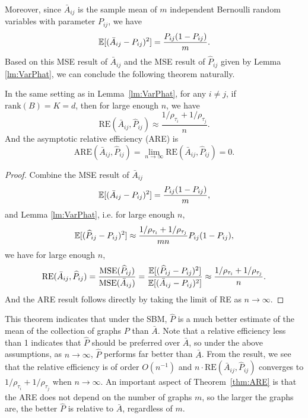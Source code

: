 Moreover, since $\bar{A}_{ij}$ is the sample mean of $m$ independent Bernoulli random variables with parameter $P_{ij}$, we have
\[
    \mathbb{E}[(\bar{A}_{ij} - P_{ij})^2] = \frac{P_{ij}(1-P_{ij})}{m}.
\]
Based on this MSE result of $\bar{A}_{ij}$ and the MSE result of $\hat{P}_{ij}$ given by Lemma \ref{lm:VarPhat}, we can conclude the following theorem naturally.
\begin{theorem}
\label{thm:ARE}
In the same setting as in Lemma~\ref{lm:VarPhat}, for any $i \ne j$, if $\mathrm{rank}(B)=K=d$, then for large enough $n$, we have
\begin{equation}
	    \mathrm{RE}(\bar{A}_{ij}, \hat{P}_{ij}) \approx
    \frac{1/\rho_{\tau_i} + 1/\rho_{\tau_j}}{n}.
\label{eq:approx_re}
\end{equation}
And the asymptotic relative efficiency (ARE) is 
\[
    \mathrm{ARE}(\bar{A}_{ij}, \hat{P}_{ij}) = \lim_{n \to \infty} \mathrm{RE}(\bar{A}_{ij}, \hat{P}_{ij}) = 0.
    \label{eq:sbm_are}
\]
\end{theorem}
\begin{proof}
Combine the MSE result of $\bar{A}_{ij}$
\[
    \mathbb{E}[(\bar{A}_{ij} - P_{ij})^2] = \frac{P_{ij}(1-P_{ij})}{m},
\]
and Lemma \ref{lm:VarPhat}, i.e. for large enough $n$,
\[
    \mathbb{E}[(\widehat{P}_{ij} - P_{ij})^2] \approx
    \frac{1/\rho_{\tau_i} + 1/\rho_{\tau_j}}{m n} P_{ij}(1-P_{ij}),
\]
we have for large enough $n$,
\[
	    \mathrm{RE}(\bar{A}_{ij}, \widehat{P}_{ij}) = \frac{\mathrm{MSE}(\widehat{P}_{ij})}{\mathrm{MSE}(\bar{A}_{ij})}
	    = \frac{\mathbb{E}[(\widehat{P}_{ij} - P_{ij})^2]}{\mathbb{E}[(\bar{A}_{ij} - P_{ij})^2]}
	    \approx \frac{1/\rho_{\tau_i} + 1/\rho_{\tau_j}}{n}.
\]
And the ARE result follows directly by taking the limit of RE as $n \to \infty$.
\end{proof}

This theorem indicates that under the SBM, $\hat{P}$ is a much better estimate of the mean of the collection of graphs $P$ than $\bar{A}$.
Note that a relative efficiency less than 1 indicates that $\hat{P}$ should be preferred over $\bar{A}$, so under the above assumptions, as $n \to \infty$, $\hat{P}$ performs far better than $\bar{A}$.
From the result, we see that the relative efficiency is of order $O(n^{-1})$ and $n \cdot \mathrm{RE}(\bar{A}_{ij}, \hat{P}_{ij})$ converges to $1/\rho_{\tau_i}+1/\rho_{\tau_j}$ when $n \to \infty$.
An important aspect of Theorem~\ref{thm:ARE} is that the ARE does not depend on the number of graphs $m$, so the larger the graphs are, the better $\hat{P}$ is relative to $\bar{A}$, regardless of $m$.

